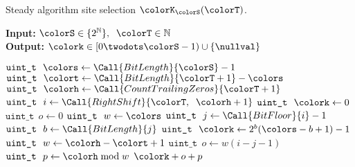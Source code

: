 \begin{algorithm}[H]
\caption{Steady algorithm site selection $\colorK_{\colorS}(\colorT)$.}
\label{alg:steady-site-selection}
\begin{minipage}{0.5\textwidth}
    \hspace*{\algorithmicindent} \textbf{Input:} $\colorS \in \{2^{\mathbb{N}}\},\;\; \colorT \in \mathbb{N}$ \\
    \hspace*{\algorithmicindent} \textbf{Output:} $\colork \in [0 \twodots \colorS - 1) \cup \{\nullval\}$ 
    \begin{algorithmic}[1]
        \State $\texttt{uint\_t} ~ ~ \colors \gets \Call{BitLength}{\colorS} - 1$
        \State $\texttt{uint\_t} ~ ~ \colort \gets \Call{BitLength}{\colorT+1} - \colors $ 
        \State $\texttt{uint\_t} ~ ~ \colorh \gets \Call{CountTrailingZeros}{\colorT + 1}$ 
         
        \State \Return \nullval {}
        \EndIf
        \State $\texttt{uint\_t} ~ ~ i \gets \Call{RightShift}{\colorT, \;\; \colorh + 1}$ 
         
        \State $\texttt{uint\_t} ~ ~ \colork \gets 0$ 
        \State $\texttt{uint\_t} ~ ~ o \gets 0$ 
        \State $\texttt{uint\_t} ~ ~ w \gets \colors$ 
        \Else
        \State $\texttt{uint\_t} ~ ~ j \gets \Call{BitFloor}{i} - 1$ 
        \State $\texttt{uint\_t} ~ ~ b \gets \Call{BitLength}{j}$ 
        \State $\texttt{uint\_t} ~ ~ \colork \gets 2^{b}(\colors - b + 1) - 1$ 
        \State $\texttt{uint\_t} ~ ~ w \gets \colorh - \colort + 1$ 
        \State $\texttt{uint\_t} ~ ~ o \gets w (i - j - 1)$ 
        \EndIf
        \State $\texttt{uint\_t} ~ ~ p \gets \colorh \bmod w$ 
        \State \Return $\colork + o + p$ 
    \end{algorithmic}
\end{minipage}
\end{algorithm}
